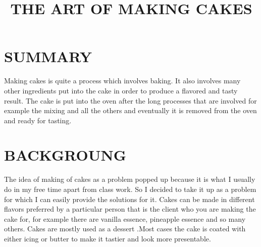 \documentclass[14pt]{article}
\begin{document}
\title{THE ART OF MAKING CAKES}

\maketitle

\section{SUMMARY}
Making cakes is quite a process which involves baking. It also involves many other ingredients put into the cake in order to produce a flavored and tasty result. The cake is put into the oven after the long processes that are involved for example the mixing and all the others and eventually it is removed from the oven and ready for tasting.

\section{BACKGROUNG}
The idea of making of cakes as a problem popped up because it is what I usually do in my free time apart from class work. So I decided to take it up as a problem for which I can easily provide the solutions for it. Cakes can be made in different flavors preferred by a particular person that is the client who you are making the cake for, for example there are vanilla essence, pineapple essence and so many others. Cakes are mostly used as a dessert .Most cases the cake is coated with either icing or butter to make it tastier and look more presentable.
\end{document}
